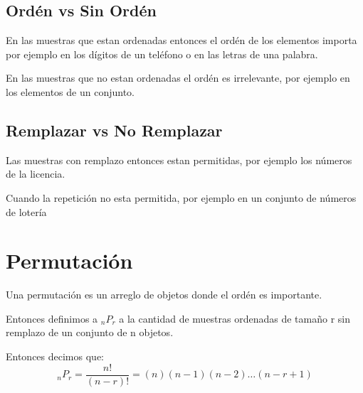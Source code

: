 \documentclass[12pt, fleqn]{report}                             %
\theoremstyle{break}                                            %
\begin{document}
            
            \subsection{Ordén vs Sin Ordén}

                En las muestras que estan ordenadas entonces el ordén de los elementos importa
                por ejemplo en los dígitos de un teléfono o en las letras de una palabra.

                En las muestras que no estan ordenadas el ordén es irrelevante, por ejemplo en los
                elementos de un conjunto.

            \subsection{Remplazar vs No Remplazar}

                Las muestras con remplazo entonces estan permitidas, por ejemplo los números de
                la licencia.

                Cuando la repetición no esta permitida, por ejemplo en un conjunto de números de lotería




        \clearpage
        \section{Permutación}

            Una permutación es un arreglo de objetos donde el ordén es importante. 

            Entonces definimos a ${}_nP_r$ a la cantidad de muestras ordenadas de tamaño r sin remplazo
            de un conjunto de n objetos.

            Entonces decimos que:
            \begin{equation*}
                {}_nP_r
                    = \frac{n!}{(n - r)!}          
                    = (n)(n-1)(n-2)\dots(n-r+1)
            \end{equation*}
\end{document}
